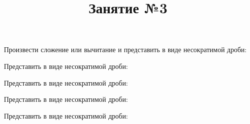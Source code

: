\title{Занятие №3}
\begin{listofex}
	\item Произвести сложение или вычитание и представить в виде несократимой дроби:
	\begin{enumcols}[itemcolumns=2]
		\item {}
		\item {}
		\item {}
		\item {}
		\item {}
	\end{enumcols}
	\item Представить в виде несократимой дроби:
	\begin{enumcols}[itemcolumns=2]
		\item {}
		\item {}
		\item {}
		\item {}
		\item {}
		\item {}
		\item {}
		\item {}
	\end{enumcols}
	\item Представить в виде несократимой дроби:
	\begin{enumcols}[itemcolumns=2]
		\item {}
		\item {}
		\item {}
		\item {}
		\item {}
	\end{enumcols}
	\item Представить в виде несократимой дроби:
	\begin{enumcols}[itemcolumns=2]
		\item {}
		\item {}
		\item {}
		\item {}
	\end{enumcols}
	\item Представить в виде несократимой дроби:
	\begin{enumcols}[itemcolumns=2]
		\item {}
		\item {}
		\item {}
		\item {}
		\item {}
		\item {}
		\item {}
		\item {}
		\item {}
	\end{enumcols}
\end{listofex}
